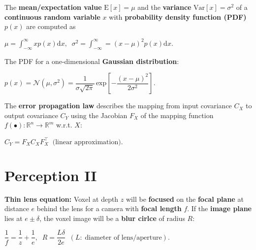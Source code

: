 \documentclass[landscape]{article}
\newcommand{\vmspace}{\vspace{-7pt}}
\newcommand{\vpspace}{\vspace{5pt}}
\newcommand{\vtspace}{\vspace{-10pt}}
\begin{document}
\begin{multicols}{3}
\vpspace

\begin{minipage}{\columnwidth}
  The \textbf{mean/expectation value} $\mathrm{E}[x] = \mu$ and the
  \textbf{variance} $\mathrm{Var}[x] = \sigma^2$ of a \textbf{continuous random
  variable} $x$ with \textbf{probability density function (PDF)} $p(x)$ are
  computed as
  \vmspace
  \begin{center}
    $\mu = \int_{-\infty}^{\infty}xp(x)\mathrm dx,\;\;
    \sigma^2 = \int_{-\infty}^{\infty} = (x - \mu)^2 p(x)
    \mathrm dx.$
  \end{center}
\end{minipage}

\vpspace

\begin{minipage}{\columnwidth}
  The PDF for a one-dimensional \textbf{Gaussian distribution}:
  \vmspace
  \begin{center}
    $p(x)
    =
    \mathcal N (\mu, \sigma^2)
    =
    \dfrac{1}{\sigma \sqrt{2\pi}}\,\mathrm{exp}\left[-\dfrac{(x -
    \mu)^2}{2\sigma^2}\right].$
  \end{center}
\end{minipage}

\vpspace

\begin{minipage}{\columnwidth}
  The \textbf{error propagation law} describes the mapping from input covariance
  $C_X$ to output covariance $C_Y$ using the Jacobian $F_X$ of the mapping
  function $f(\bullet): \mathbb{R}^n \rightarrow \mathbb{R}^m$ w.r.t. $X$:
  \vmspace
  \begin{center}
    $C_Y=F_XC_XF_X^\intercal\;\;\text{(linear approximation)}.$
  \end{center}
\end{minipage}


\vtspace

\section{Perception II}

\vmspace

\begin{minipage}{\columnwidth}
  \textbf{Thin lens equation:} Voxel at depth $z$ will be \textbf{focused} on
  the \textbf{focal plane} at distance $e$ behind the lens for a camera with
  \textbf{focal length} $f$. If the \textbf{image plane} lies at $e \pm \delta$,
  the voxel image will be a \textbf{blur cirlce} of radius $R$:
  \vmspace
  \begin{center}
    $\dfrac{1}{f} = \dfrac{1}{z} + \dfrac{1}{e},\;\; R = \dfrac{L \delta}{2e}
    \;\;
    (L:\;\text{diameter of lens/aperture}).$
  \end{center}
\end{minipage}


\end{multicols}
\end{document}
